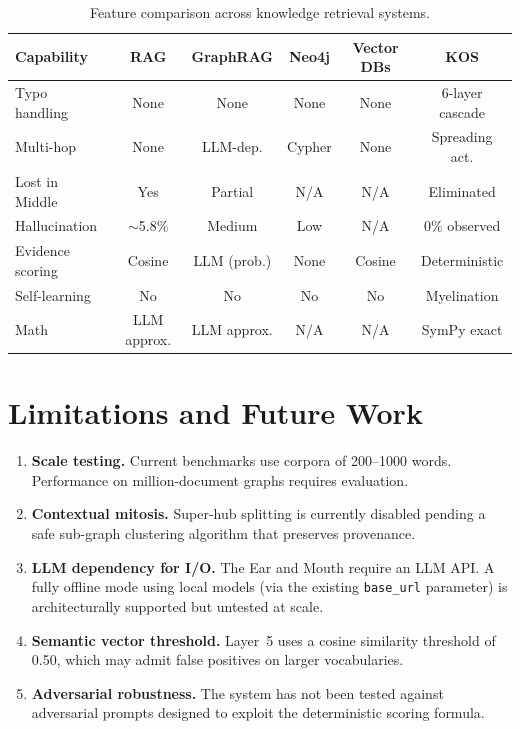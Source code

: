 \documentclass[11pt,a4paper]{article}
\begin{document}
\begin{table}[ht]
\centering
\caption{Feature comparison across knowledge retrieval systems.}
\label{tab:comparison}
\begin{tabular}{@{}lccccc@{}}
\toprule
\textbf{Capability} & \textbf{RAG} & \textbf{GraphRAG} & \textbf{Neo4j} & \textbf{Vector DBs} & \textbf{KOS} \\
\midrule
Typo handling       & None  & None        & None   & None   & 6-layer cascade \\
Multi-hop           & None  & LLM-dep.    & Cypher & None   & Spreading act. \\
Lost in Middle      & Yes   & Partial     & N/A    & N/A    & Eliminated \\
Hallucination       & $\sim$5.8\% & Medium & Low    & N/A    & 0\% observed \\
Evidence scoring    & Cosine & LLM (prob.) & None  & Cosine & Deterministic \\
Self-learning       & No    & No          & No     & No     & Myelination \\
Math                & LLM approx. & LLM approx. & N/A & N/A & SymPy exact \\
\bottomrule
\end{tabular}
\end{table}

\section{Limitations and Future Work}

\begin{enumerate}
  \item \textbf{Scale testing.} Current benchmarks use corpora of 200--1000 words. Performance on million-document graphs requires evaluation.

  \item \textbf{Contextual mitosis.} Super-hub splitting is currently disabled pending a safe sub-graph clustering algorithm that preserves provenance.

  \item \textbf{LLM dependency for I/O.} The Ear and Mouth require an LLM API. A fully offline mode using local models (via the existing \texttt{base\_url} parameter) is architecturally supported but untested at scale.

  \item \textbf{Semantic vector threshold.} Layer~5 uses a cosine similarity threshold of 0.50, which may admit false positives on larger vocabularies.

  \item \textbf{Adversarial robustness.} The system has not been tested against adversarial prompts designed to exploit the deterministic scoring formula.
\end{enumerate}
\end{document}
